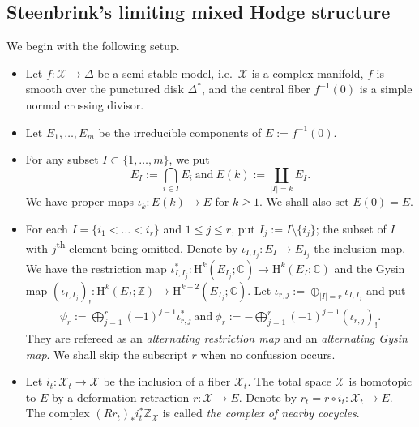 \subsection{Steenbrink's limiting mixed Hodge structure}
\label{subsec:st-limiting-mhs}
We begin with the following setup.
\begin{itemize}
    \item Let \(f\colon \mathcal{X}\to \Delta\) be a semi-stable model, 
    i.e.~\(\mathcal{X}\) is a complex manifold, \(f\) is smooth over the punctured disk \(\Delta^{\ast}\),
    and the central fiber \(f^{-1}(0)\) is a simple normal crossing divisor.
    \item Let \(E_{1},\ldots,E_{m}\) be the irreducible components of \(E:=f^{-1}(0)\).
    \item For any subset \(I\subset \{1,\ldots,m\}\), we put
    \begin{equation*}
        E_{I}:=\bigcap_{i\in I} E_{i}~\mbox{and}~E(k):=\coprod_{|I|=k} E_{I}.
    \end{equation*}
    We have proper maps \(\iota_{k}\colon E(k)\to E\) for \(k\ge 1\).
    We shall also set \(E(0) = E\).
    \item For each \(I=\{i_{1}<\ldots<i_{r}\}\) and \(1\le j\le r\), 
    put \(I_{j}:=I\setminus \{i_{j}\}\); the subset of \(I\) with
    \(j\)\textsuperscript{th}
    element being omitted.
    Denote by \(\iota_{I,I_{j}}\colon E_{I}\to E_{I_{j}}\) the inclusion map.
    We have the restriction map \(\iota_{I,I_{j}}^{\ast}\colon \mathrm{H}^{k}(E_{I_{j}};\mathbb{C})
    \to\mathrm{H}^{k}(E_{I};\mathbb{C})\) and the
    Gysin map \((\iota_{I,I_{j}})_{!}\colon \mathrm{H}^{k}(E_{I};\mathbb{Z})
    \to\mathrm{H}^{k+2}(E_{I_{j}};\mathbb{C})\).
    Let \(\iota_{r,j}:=\oplus_{|I|=r} \iota_{I,I_{j}}\) and put
    \begin{eqnarray*}
    \psi_{r}:=\bigoplus_{j=1}^{r} (-1)^{j-1}\iota_{r,j}^{\ast}~\mbox{and}~
    \phi_{r}:=-\bigoplus_{j=1}^{r} (-1)^{j-1}(\iota_{r,j})_{!}.
    \end{eqnarray*}
    They are refereed as an \emph{alternating restriction map} and
    an \emph{alternating Gysin map}.
    We shall skip the subscript \(r\) when no confussion occurs.
    \item Let \(i_{t}\colon \mathcal{X}_{t}\to\mathcal{X}\) 
    be the inclusion of a fiber \(\mathcal{X}_{t}\).
    The total space \(\mathcal{X}\) is homotopic to \(E\) by a deformation retraction
    \(r\colon \mathcal{X}\to E\).
    Denote by \(r_{t}=r\circ i_{t}\colon\mathcal{X}_{t}\to E\).
    The complex \((Rr_{t})_{\ast}i_{t}^{\ast}\mathbb{Z}_{\mathcal{X}}\) is called 
    \emph{the complex of nearby cocycles}.
\end{itemize}
